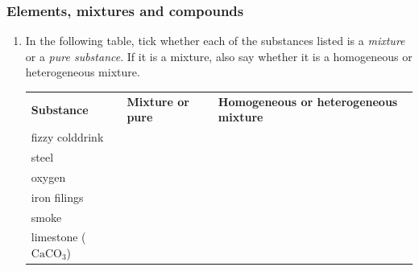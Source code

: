             \subsubsection{ Elements, mixtures and compounds         }
            \nopagebreak
            \label{m38708*id63472}\begin{enumerate}[noitemsep, label=\textbf{\arabic*}. ] 
            \label{m38708*uid28}\item In the following table, tick whether each of the substances listed is a \textsl{mixture} or a \textsl{pure substance}. If it is a mixture, also say whether it is a homogeneous or heterogeneous mixture.
          \begin{table}[H]
        \begin{center}
      \label{m38708*id63499}
    \noindent
      \tablelasttail{}
      \begin{xtabular}[t]{|l|l|l|}\hline
        \textbf{Substance} &
        \textbf{Mixture or pure} &
        \textbf{Homogeneous or heterogeneous mixture}%
     \tabularnewline{}
        fizzy colddrink &
         &
     \tabularnewline{}
        steel &
         &
     \tabularnewline{}
        oxygen &
         &
     \tabularnewline{}
        iron filings &
         &
     \tabularnewline{}
        smoke &
         &
     \tabularnewline{}
        limestone (${\mathrm{CaCO}}_{3}$) &

\end{xtabular}
\end{center}
\end{table}
\end{enumerate}
